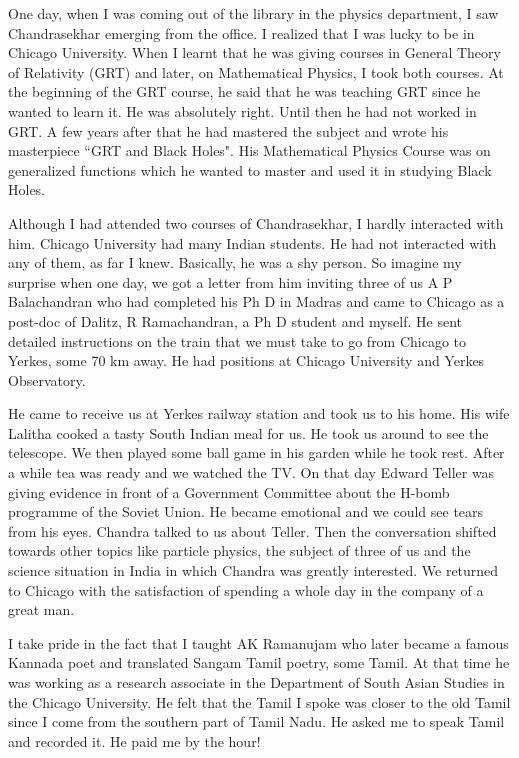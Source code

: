 One day, when I was coming out of the library in the physics department, 
I saw Chandrasekhar emerging from the office. I realized that I was 
lucky to be in Chicago University. When I learnt that he was giving 
courses in General Theory of Relativity (GRT) and later, on Mathematical 
Physics, I took both courses. At the beginning of the GRT course, he 
said that he was teaching GRT since he wanted to learn it. He was 
absolutely right. Until then he had not worked in GRT. A few years after 
that he had mastered the subject and wrote his masterpiece ``GRT and 
Black Holes". His Mathematical Physics Course was on generalized 
functions which he wanted to master and used it in studying Black Holes.

Although I had attended two courses of Chandrasekhar, I hardly 
interacted with him. Chicago University had many Indian students. He had 
not interacted with any of them, as far I knew. Basically, he was a shy 
person. So imagine my surprise when one day, we got a letter from him 
inviting three of us A P Balachandran who had completed his Ph D in 
Madras and came to Chicago as a post-doc of Dalitz, R Ramachandran, a Ph 
D student and myself. He sent detailed instructions on the train that we 
must take to go from Chicago to Yerkes, some 70 km away. He had 
positions at Chicago University and Yerkes Observatory.

He came to receive us at Yerkes railway station and took us to his home. 
His wife Lalitha cooked a tasty South Indian meal for us. He took us 
around to see the telescope. We then played some ball game in his garden 
while he took rest. After a while tea was ready and we watched the TV. 
On that day Edward Teller was giving evidence in front of a Government 
Committee about the H-bomb programme of the Soviet Union. He became 
emotional and we could see tears from his eyes. Chandra talked to us 
about Teller. Then the conversation shifted towards other topics like 
particle physics, the subject of three of us and the science situation 
in India in which Chandra was greatly interested. We returned to Chicago 
with the satisfaction of spending a whole day in the company of a great 
man.
  
I take pride in the fact that I taught AK Ramanujam who later became
a famous Kannada poet and translated Sangam Tamil poetry, some Tamil.
At that time he was working as a research associate in the Department
of South Asian Studies in the Chicago University. He felt that the
Tamil I spoke was closer to the old Tamil since I come from the
southern part of Tamil Nadu. He asked me to speak Tamil and recorded it.
He paid me by the hour!

